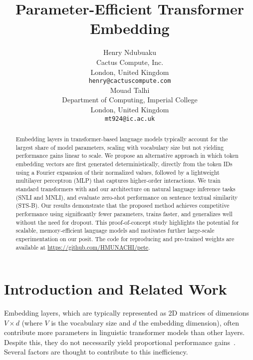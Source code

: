 \documentclass{article}
\begin{document}
\begin{center}
\title{Parameter-Efficient Transformer Embedding}
\end{center}
\author{Henry Ndubuaku \\ 
Cactus Compute, Inc. \\
London, United Kingdom \\
\texttt{henry@cactuscompute.com} \\
\And
Mouad Talhi \\
Department of Computing, Imperial College \\
London, United Kingdom \\
\texttt{mt924@ic.ac.uk} \\
}
\maketitle
\begin{abstract}
Embedding layers in transformer-based language models typically account for the largest share of model parameters, scaling with vocabulary size but not yielding performance gains linear to scale. We propose an alternative approach in which token embedding vectors are first generated deterministically, directly from the token IDs using a Fourier expansion of their normalized values, followed by a lightweight multilayer perceptron (MLP) that captures higher-order interactions. We train standard transformers with and our architecture on natural language inference tasks (SNLI and MNLI), and evaluate zero-shot performance on sentence textual similarity (STS-B). Our results demonstrate that the proposed method achieves competitive performance using significantly fewer parameters, trains faster, and generalizes well without the need for dropout. This proof-of-concept study highlights the potential for scalable, memory-efficient language models and motivates further large-scale experimentation on our posit. The code for reproducing and pre-trained weights are available at \url{https://github.com/HMUNACHI/pete}.
\end{abstract}
\section{Introduction and Related Work}
Embedding layers, which are typically represented as 2D matrices of dimensions \(V \times d\) (where \(V\) is the vocabulary size and \(d\) the embedding dimension), often contribute more parameters in linguistic transformer models than other layers. Despite this, they do not necessarily yield proportional performance gains~\cite{lan2019albert, rajbhandari2020zero, shen2020qbert}. Several factors are thought to contribute to this inefficiency. 
\end{document}
